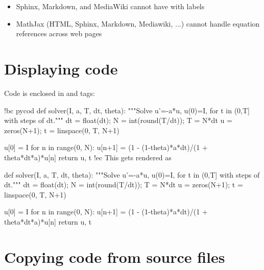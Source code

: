 \documentclass[%
twoside,                 %
draft,                   %
final,                   %
chapterprefix=true,      %
open=right               %
10pt]{book}
\newenvironment{graybox1admon}[1][]{
\begin{graybox1mdframed}[frametitle=#1]
}
{
\end{graybox1mdframed}
}
\begin{document}
\begin{shadedquoteBlue}
\begin{equation}
\end{equation}

\begin{align*}
\end{align*}

\begin{align}
\end{align}
\eccq


\begin{graybox1admon}[Doconce fix of shortcomings.]
\begin{itemize}
 \item Sphinx, Markdown, and MediaWiki cannot have
    with labels

 \item MathJax (HTML, Sphinx, Markdown, Mediawiki, ...) cannot
   handle equation references across web pages
\end{itemize}

\noindent
\end{graybox1admon}



\section*{Displaying code}

Code is enclosed in  and  tags:

\bccq
!bc pycod
def solver(I, a, T, dt, theta):
    """Solve u'=-a*u, u(0)=I, for t in (0,T] with steps of dt."""
    dt = float(dt); N = int(round(T/dt)); T = N*dt
    u = zeros(N+1); t = linspace(0, T, N+1)

    u[0] = I
    for n in range(0, N):
        u[n+1] = (1 - (1-theta)*a*dt)/(1 + theta*dt*a)*u[n]
    return u, t
!ec
\eccq
This gets rendered as

\bpycod
def solver(I, a, T, dt, theta):
    """Solve u'=-a*u, u(0)=I, for t in (0,T] with steps of dt."""
    dt = float(dt); N = int(round(T/dt)); T = N*dt
    u = zeros(N+1); t = linspace(0, T, N+1)

    u[0] = I
    for n in range(0, N):
        u[n+1] = (1 - (1-theta)*a*dt)/(1 + theta*dt*a)*u[n]
    return u, t
\epycod



\section*{Copying code from source files}


\end{shadedquoteBlue}
\end{document}
